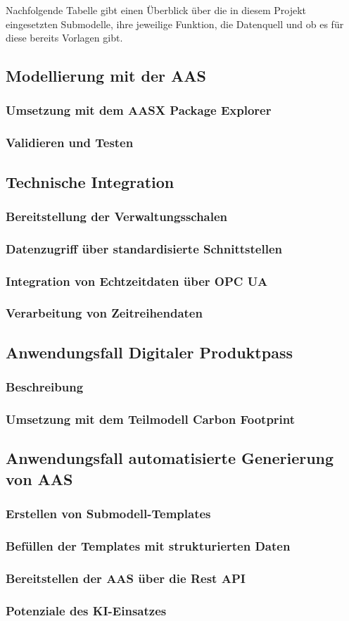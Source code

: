 Nachfolgende Tabelle gibt einen Überblick über die in diesem Projekt eingesetzten Submodelle, ihre jeweilige Funktion, die Datenquell und ob es für diese bereits Vorlagen gibt.



\subsection{Modellierung mit der AAS}
\subsubsection{Umsetzung mit dem AASX Package Explorer}
\subsubsection{Validieren und Testen}
\subsection{Technische Integration}
\subsubsection{Bereitstellung der Verwaltungsschalen}
\subsubsection{Datenzugriff über standardisierte Schnittstellen}
\subsubsection{Integration von Echtzeitdaten über OPC UA}
\subsubsection{Verarbeitung von Zeitreihendaten}
\subsection{Anwendungsfall Digitaler Produktpass}
\subsubsection{Beschreibung}
\subsubsection{Umsetzung mit dem Teilmodell Carbon Footprint}
\subsection{Anwendungsfall automatisierte Generierung von AAS}
\subsubsection{Erstellen von Submodell-Templates}
\subsubsection{Befüllen der Templates mit strukturierten Daten}
\subsubsection{Bereitstellen der AAS über die Rest API}
\subsubsection{Potenziale des KI-Einsatzes}